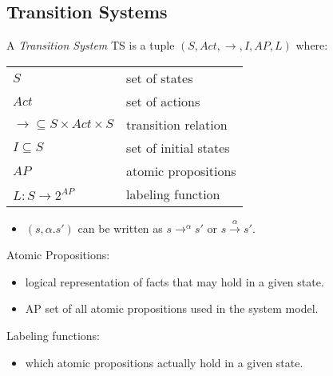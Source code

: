 \documentclass[a4paper, 10pt]{article}
\begin{document}
\subsection{Transition Systems}

\begin{mdframed}[roundcorner=5pt,
subtitlebelowline=false,subtitleaboveline=false,
subtitlebackgroundcolor=blue!50,
frametitlerule=true,
frametitlebackgroundcolor=blue!50,
frametitle={Transition System}
]
A \emph{Transition System} TS is a tuple $(S,Act,\rightarrow, I, AP, L)$ where:\\
\begin{tabular}{ll}
$S$ & set of states\\
$Act$ & set of actions\\
$\rightarrow\subseteq S\times Act\times S$ & transition relation\\
$I\subseteq S$ & set of initial states\\
$AP$ & atomic propositions\\
$L:S\rightarrow 2^{AP}$ & labeling function\\
\end{tabular}
\begin{itemize}
    \item $(s,\alpha.s')$ can be written as $s\rightarrow^\alpha s'$ or $s\overset{\alpha}{\longrightarrow}s'$.
\end{itemize}
\end{mdframed}
\begin{center}
\scalebox{1.5}{}
\end{center}

Atomic Propositions:
\begin{itemize}
    \item logical representation of facts that may hold in a given state.
    \item AP set of all atomic propositions used in the system model.
\end{itemize}

Labeling functions:
\begin{itemize}
    \item which atomic propositions actually hold in a given state.
\end{itemize}
\end{document}
